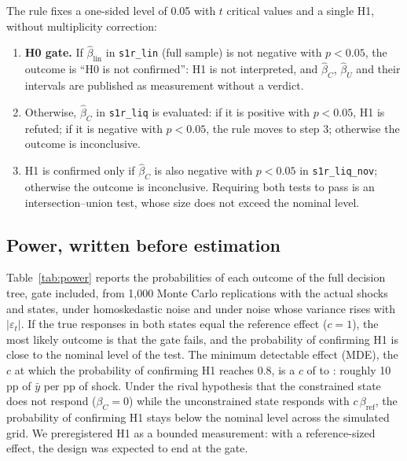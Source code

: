 \documentclass[11pt]{article}
\theoremstyle{remark}
\begin{document}
The rule fixes a one-sided level of 0.05 with $t$ critical values and a single H1, without multiplicity correction: %
\begin{enumerate}
\item \textbf{H0 gate.} If $\hat\beta_{\text{lin}}$ in \texttt{s1r\_lin} (full sample) is not negative with $p<0.05$, the outcome %
is ``H0 is not confirmed'': H1 is not interpreted, and $\hat\beta_C$, $\hat\beta_U$ and their intervals are published as
measurement without a verdict.
\item Otherwise, $\hat\beta_C$ in \texttt{s1r\_liq} is evaluated: if it is positive with $p<0.05$, H1 is refuted; if it is %
negative with $p<0.05$, the rule moves to step 3; otherwise the outcome is inconclusive. %
\item H1 is confirmed only if $\hat\beta_C$ is also negative with $p<0.05$ in \texttt{s1r\_liq\_nov}; otherwise the outcome is %
inconclusive. Requiring both tests to pass is an intersection--union test, whose size does not exceed the nominal level.
\end{enumerate}

\subsection{Power, written before estimation}

Table~\ref{tab:power} reports the probabilities of each outcome of the full decision tree, gate included, from 1,000 Monte Carlo
replications with the actual shocks and states, under homoskedastic noise and under noise whose variance rises with $|\varepsilon_t|$.
If the true responses in both states equal the reference effect ($c=1$), the most likely outcome is that the gate fails, and the
probability of confirming H1 is close to the nominal level of the test. The minimum detectable effect (MDE), the $c$ at which the
probability of confirming H1 reaches 0.8, is a $c$ of \MdeHetC{} to \MdeHomoC: roughly 10 pp of $\bar y$ per pp of shock. Under the rival hypothesis that the %
constrained state does not respond ($\beta_C=0$) while the unconstrained state responds with $c\,\beta_{\text{ref}}$, the
probability of confirming H1 stays below the nominal level across the simulated grid. We preregistered H1 as a bounded measurement:
with a reference-sized effect, the design was expected to end at the gate.
\end{document}
